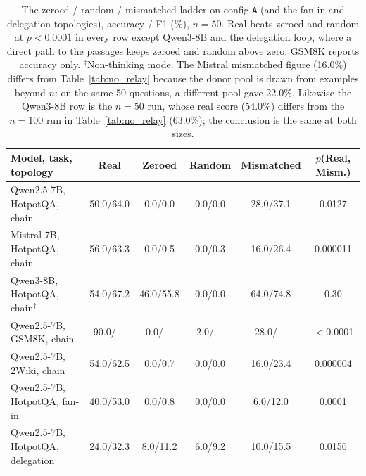 \documentclass[11pt]{article}
\begin{document}
\begin{table}[t]
\centering
\small
\caption{The zeroed / random / mismatched ladder on config \texttt{A} (and the
fan-in and delegation topologies), accuracy / F1 (\%), $n{=}50$. Real beats
zeroed and random at $p<0.0001$ in every row except Qwen3-8B and the
delegation loop, where a direct path to the passages keeps zeroed and random
above zero. GSM8K reports accuracy only. $^\dagger$Non-thinking mode. The Mistral
mismatched figure (16.0\%) differs from Table~\ref{tab:no_relay} because the donor
pool is drawn from examples beyond $n$: on the same 50 questions, a different pool
gave 22.0\%. Likewise the Qwen3-8B row is the $n{=}50$ run, whose real score
(54.0\%) differs from the $n{=}100$ run in Table~\ref{tab:no_relay} (63.0\%); the
conclusion is the same at both sizes.}
\label{tab:ladder}
\begin{tabular}{lccccc}
\toprule
\textbf{Model, task, topology} & \textcolor{realblue}{\textbf{Real}} & \textbf{Zeroed} & \textbf{Random} & \textcolor{wrongred}{\textbf{Mismatched}} & $p$(Real, Mism.) \\
\midrule
Qwen2.5-7B, HotpotQA, chain       & 50.0/64.0 & 0.0/0.0   & 0.0/0.0 & 28.0/37.1 & 0.0127 \\
Mistral-7B, HotpotQA, chain       & 56.0/63.3 & 0.0/0.5   & 0.0/0.3 & 16.0/26.4 & 0.000011 \\
Qwen3-8B, HotpotQA, chain$^\dagger$ & 54.0/67.2 & 46.0/55.8 & 0.0/0.0 & 64.0/74.8 & 0.30 \\
Qwen2.5-7B, GSM8K, chain          & 90.0/--- & 0.0/---   & 2.0/--- & 28.0/---  & $<$0.0001 \\
Qwen2.5-7B, 2Wiki, chain          & 54.0/62.5 & 0.0/0.7   & 0.0/0.0 & 16.0/23.4 & 0.000004 \\
Qwen2.5-7B, HotpotQA, fan-in      & 40.0/53.0 & 0.0/0.8   & 0.0/0.0 & 6.0/12.0  & 0.0001 \\
Qwen2.5-7B, HotpotQA, delegation  & 24.0/32.3 & 8.0/11.2  & 6.0/9.2 & 10.0/15.5 & 0.0156 \\
\bottomrule
\end{tabular}
\end{table}
\end{document}
